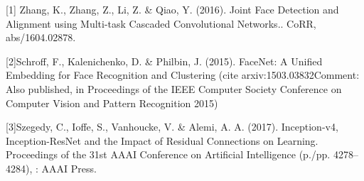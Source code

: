 \documentclass{article}
\begin{document}
\medskip

\small

[1] Zhang, K., Zhang, Z., Li, Z. & Qiao, Y. (2016). Joint Face Detection and Alignment using Multi-task Cascaded Convolutional Networks.. CoRR, abs/1604.02878.

[2]Schroff, F., Kalenichenko, D. & Philbin, J. (2015). FaceNet: A Unified Embedding for Face Recognition and Clustering (cite arxiv:1503.03832Comment: Also published, in Proceedings of the IEEE Computer Society Conference on Computer Vision and Pattern Recognition 2015)

[3]Szegedy, C., Ioffe, S., Vanhoucke, V. & Alemi, A. A. (2017). Inception-v4, Inception-ResNet and the Impact of Residual Connections on Learning. Proceedings of the 31st AAAI Conference on Artificial Intelligence (p./pp. 4278--4284), : AAAI Press.
\end{document}
